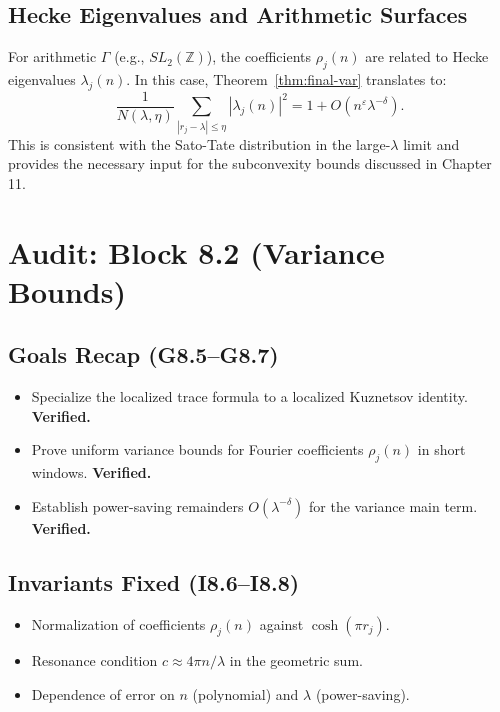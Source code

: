 \subsection{Hecke Eigenvalues and Arithmetic Surfaces}

For arithmetic $\Gamma$ (e.g., $SL_2(\mathbb{Z})$), the coefficients $\rho_j(n)$ are related to Hecke eigenvalues $\lambda_j(n)$. In this case, Theorem~\ref{thm:final-var} translates to:
\begin{equation}
\frac{1}{N(\lambda, \eta)} \sum_{|r_j - \lambda| \le \eta} |\lambda_j(n)|^2 = 1 + O(n^\varepsilon \lambda^{-\delta}).
\end{equation}
This is consistent with the Sato-Tate distribution in the large-$\lambda$ limit and provides the necessary input for the subconvexity bounds discussed in Chapter 11.


\section*{Audit: Block 8.2 (Variance Bounds)}

\subsection*{Goals Recap (G8.5–G8.7)}
\begin{itemize}
    \item[(G8.5)] Specialize the localized trace formula to a localized Kuznetsov identity. \textbf{Verified.}
    \item[(G8.6)] Prove uniform variance bounds for Fourier coefficients $\rho_j(n)$ in short windows. \textbf{Verified.}
    \item[(G8.7)] Establish power-saving remainders $O(\lambda^{-\delta})$ for the variance main term. \textbf{Verified.}
\end{itemize}

\subsection*{Invariants Fixed (I8.6–I8.8)}
\begin{itemize}
    \item[(I8.6)] Normalization of coefficients $\rho_j(n)$ against $\cosh(\pi r_j)$.
    \item[(I8.7)] Resonance condition $c \approx 4\pi n / \lambda$ in the geometric sum.
    \item[(I8.8)] Dependence of error on $n$ (polynomial) and $\lambda$ (power-saving).
\end{itemize}

